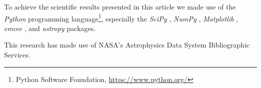 \documentclass[letterpaper]{ar-1col}
\begin{document}

To achieve the scientific results presented in this article we made use of the \emph{Python} programming language\footnote{Python Software Foundation, \url{https://www.python.org/}}, especially the \emph{SciPy} \citep{virtanen2020}, \emph{NumPy} \citep{numpy}, \emph{Matplotlib} \citep{Matplotlib}, \emph{emcee} \citep{foreman-mackey2013}, and \emph{astropy} \citep{astropy_1,astropy_2} packages.
%

This research has made use of NASA's Astrophysics Data System Bibliographic Services.





\end{document}
